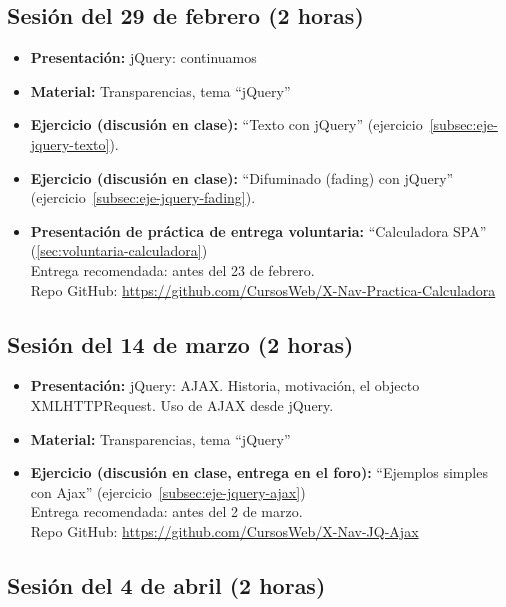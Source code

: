 \documentclass[a4paper,12pt]{report}
\begin{document}
\subsection{Sesión del 29 de febrero (2 horas)}

\begin{itemize}
\item \textbf{Presentación:} jQuery: continuamos
\item \textbf{Material:} Transparencias, tema ``jQuery''
\item \textbf{Ejercicio (discusión en clase):} ``Texto con jQuery'' (ejercicio~\ref{subsec:eje-jquery-texto}).
\item \textbf{Ejercicio (discusión en clase):} ``Difuminado (fading) con jQuery'' (ejercicio~\ref{subsec:eje-jquery-fading}).
\item \textbf{Presentación de práctica de entrega voluntaria:} ``Calculadora SPA'' (\ref{sec:voluntaria-calculadora}) \\
  Entrega recomendada: antes del 23 de febrero. \\
  Repo GitHub: \url{https://github.com/CursosWeb/X-Nav-Practica-Calculadora} \\
\end{itemize}


\subsection{Sesión del 14 de marzo (2 horas)}

\begin{itemize}
\item \textbf{Presentación:} jQuery: AJAX. Historia, motivación, el objecto XMLHTTPRequest. Uso de AJAX desde jQuery.
\item \textbf{Material:} Transparencias, tema ``jQuery''
\item \textbf{Ejercicio (discusión en clase, entrega en el foro):} ``Ejemplos simples con Ajax'' (ejercicio~\ref{subsec:eje-jquery-ajax}) \\
  Entrega recomendada: antes del 2 de marzo. \\
  Repo GitHub: \url{https://github.com/CursosWeb/X-Nav-JQ-Ajax}
\end{itemize}

\subsection{Sesión del 4 de abril (2 horas)}
\end{document}
